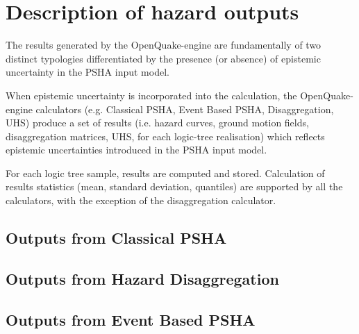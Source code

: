 \section{Description of hazard outputs}
\label{sec:hazard_outputs}

The results generated by the OpenQuake-engine are fundamentally of two
distinct typologies differentiated by the presence (or absence) of epistemic
uncertainty in the PSHA input model.

When epistemic uncertainty is incorporated into the calculation, the
OpenQuake-engine calculators (e.g. Classical PSHA, Event Based PSHA,
Disaggregation, UHS) produce a set of results (i.e. hazard curves, ground
motion fields, disaggregation matrices, UHS, for each logic-tree realisation)
which reflects epistemic uncertainties introduced in the PSHA input model.

For each logic tree sample, results are computed and stored. Calculation of
results statistics (mean, standard deviation, quantiles) are supported by all
the calculators, with the exception of the disaggregation calculator.

\subsection{Outputs from Classical PSHA}
\label{subsec:output_classical_psha}


\subsection{Outputs from Hazard Disaggregation}
\label{subsec:output_hazard_disaggregation}


\subsection{Outputs from Event Based PSHA}
\label{subsec:output_event_based_psha}

